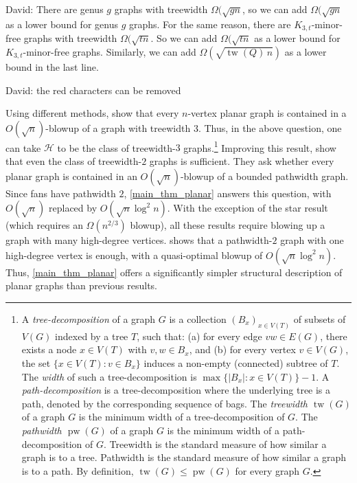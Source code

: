 \documentclass{patmorin}
\renewcommand{\leq}{\leqslant}
\newcommand{\david}[1]{{\color{orange} David: #1}}
\newcommand{\pat}[1]{\textcolor{Blue}{Pat: #1}}
\newcommand{\defin}[1]{\emph{\textcolor{brightmaroon}{#1}}}
\DeclareMathOperator{\tw}{tw}
\DeclareMathOperator{\pw}{pw}
\begin{document}
\david{There are genus $g$ graphs with treewidth $\Omega(\sqrt{gn}$, so we can add $\Omega(\sqrt{gn}$ as a lower bound for genus $g$ graphs. For the same reason, there are $K_{3,t}$-minor-free graphs with treewidth $\Omega(\sqrt{tn}$. So we can add $\Omega(\sqrt{tn}$ as a lower bound for $K_{3,t}$-minor-free graphs. Similarly, we can add $\Omega(\sqrt{\tw(Q)\,n})$ as  a lower bound in the last line.}

\david{the red characters can be removed}


Using different methods, \citet{ISW} show that every $n$-vertex planar graph is contained in a $O(\sqrt{n})$-blowup of a graph with treewidth 3. Thus, in the above question, one can take $\mathcal{H}$ to be the class of treewidth-$3$ graphs.\footnote{A \defin{tree-decomposition} of a graph $G$ is a collection $(B_x)_{x \in V(T)}$ of subsets of $V(G)$ indexed by a tree $T$, such that: (a) for every edge ${vw \in E(G)}$, there exists a node ${x \in V(T)}$ with ${v,w \in B_x}$, and (b) for every vertex ${v \in V(G)}$, the set $\{ x \in V(T) \colon v \in B_x \}$ induces a non-empty (connected) subtree of $T$. The \defin{width} of such a tree-decomposition is ${\max\{ |B_x| \colon x \in V(T) \}-1}$. A \defin{path-decomposition} is a tree-decomposition where the underlying tree is a path, denoted by the corresponding sequence of bags. The \defin{treewidth $\tw(G)$} of a graph $G$ is the minimum width of a tree-decomposition of $G$. The \defin{pathwidth $\pw(G)$} of a graph $G$ is the minimum width of a path-decomposition of $G$. Treewidth is the standard measure of how similar a graph is to a tree. Pathwidth is the standard measure of how similar a graph is to a path. By definition, $\tw(G)\leq\pw(G)$ for every graph $G$.}
Improving this result, \citet{distel.dujmovic.ea:product} show that even the class of treewidth-$2$ graphs is sufficient. They  ask whether every planar graph is contained in an $O(\sqrt{n})$-blowup of a bounded pathwidth graph.
Since fans have pathwidth $2$, \cref{main_thm_planar} answers this question, with $O(\sqrt{n})$ replaced by $O(\sqrt{n}\log^2 n)$.  With the exception of the star result (which requires an $\Omega(n^{2/3})$ blowup), all these results require blowing up a graph with many high-degree vertices.   shows that a pathwidth-$2$ graph with one high-degree vertex is enough, with a quasi-optimal blowup of $O(\sqrt{n}\log^2 n)$.  Thus, \cref{main_thm_planar} offers a significantly simpler structural description of planar graphs than previous results.
\end{document}

